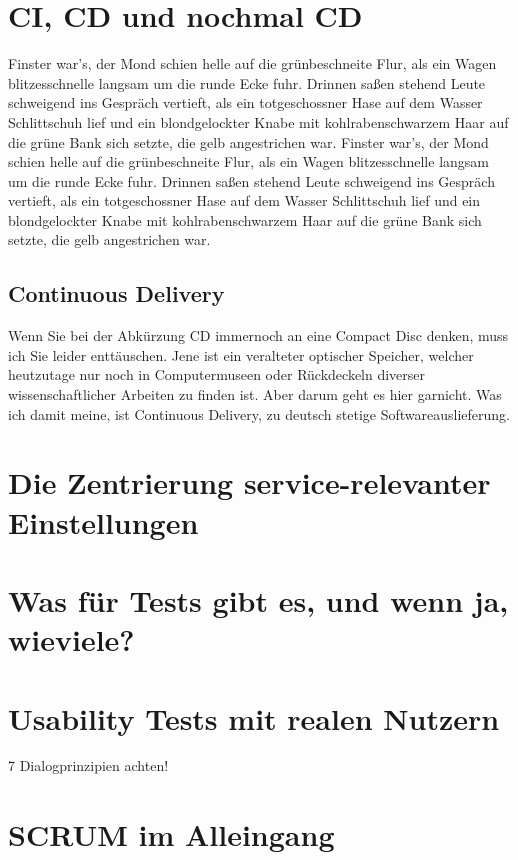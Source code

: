 \section{CI, CD und nochmal CD}
\label{sec:ci-cd-und-nochmal-cd}


Finster war's, der Mond schien helle auf die grünbeschneite Flur, als
ein Wagen blitzesschnelle langsam um die runde Ecke fuhr. Drinnen
saßen stehend Leute schweigend ins Gespräch vertieft, als ein
totgeschossner Hase auf dem Wasser Schlittschuh lief und ein
blondgelockter Knabe mit kohlrabenschwarzem Haar auf die grüne Bank
sich setzte, die gelb angestrichen war.
Finster war's, der Mond schien helle auf die grünbeschneite Flur, als
ein Wagen blitzesschnelle langsam um die runde Ecke fuhr. Drinnen
saßen stehend Leute schweigend ins Gespräch vertieft, als ein
totgeschossner Hase auf dem Wasser Schlittschuh lief und ein
blondgelockter Knabe mit kohlrabenschwarzem Haar auf die grüne Bank
sich setzte, die gelb angestrichen war.


\subsection{Continuous Delivery}
\label{subsec:continuous-delivery}
Wenn Sie bei der Abkürzung CD immernoch an eine Compact Disc denken, muss ich Sie leider enttäuschen. Jene ist ein veralteter optischer Speicher, welcher heutzutage nur noch in Computermuseen oder Rückdeckeln diverser wissenschaftlicher Arbeiten zu finden ist. Aber darum geht es hier garnicht. Was ich damit meine, ist Continuous Delivery, zu deutsch stetige Softwareauslieferung.


\section{Die Zentrierung service-relevanter Einstellungen}

\section{Was für Tests gibt es, und wenn ja, wieviele?}

\section{Usability Tests mit realen Nutzern}
7 Dialogprinzipien achten!
\section{SCRUM im Alleingang}

